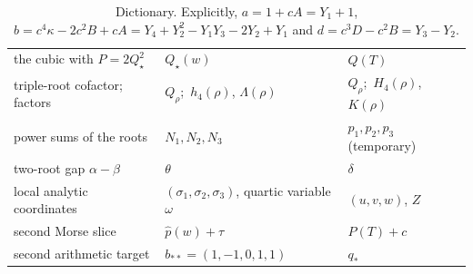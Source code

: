 \documentclass[11pt,a4paper]{article}
\theoremstyle{definition}
\newcommand{\kk}{\kappa}
\begin{document}
\begin{table}[htbp]
\begin{tabularx}{\textwidth}{@{}>{\raggedright\arraybackslash}p{}>{\raggedright\arraybackslash}p{}X@{}}
the cubic with $P=2Q_\star^2$ & $Q_\star(w)$ & $Q(T)$\\
triple-root cofactor; factors & $Q_\rho$;\ $h_4(\rho)$, $\Lambda(\rho)$ & $Q_\rho$;\ $H_4(\rho)$, $K(\rho)$\\
power sums of the roots & $N_1,N_2,N_3$ & $p_1,p_2,p_3$ (temporary)\\
two-root gap $\alpha-\beta$ & $\theta$ & $\delta$\\
local analytic coordinates & $(\sigma_1,\sigma_2,\sigma_3)$, quartic variable $\omega$ & $(u,v,w)$, $Z$\\
second Morse slice & $\hat p(w)+\tau$ & $P(T)+c$\\
second arithmetic target & $b_{**}=(1,-1,0,1,1)$ & $q_*$\\
\bottomrule
\end{tabularx}
\caption{Dictionary. Explicitly, $a=1+cA=Y_1+1$,
$b=c^4\kk-2c^2B+cA=Y_4+Y_2^2-Y_1Y_3-2Y_2+Y_1$ and
$d=c^3D-c^2B=Y_3-Y_2$.}
\label{f6:tab:dictionary}
\end{table}
\end{document}
